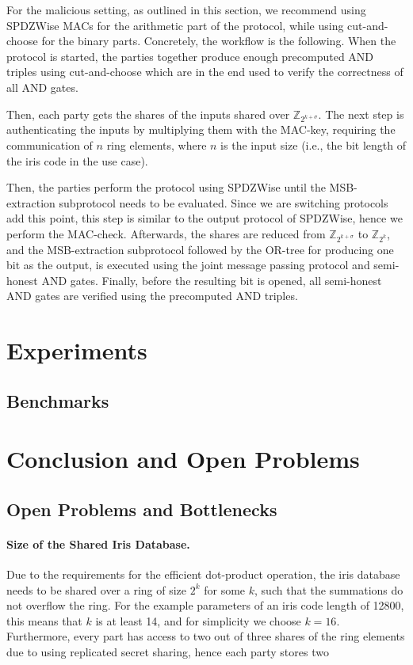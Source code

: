 \documentclass[a4paper,11pt,
]{article}
\newcommand{\Z}{\ensuremath{\mathbb{Z}}\xspace}
\begin{document}
For the malicious setting, as outlined in this section, we recommend using SPDZWise MACs  for the arithmetic part of the protocol, while using cut-and-choose  for the binary parts. Concretely, the workflow is the following. When the protocol is started, the parties together produce enough precomputed AND triples using cut-and-choose which are in the end used to verify the correctness of all AND gates.

Then, each party gets the shares of the inputs shared over $\Z_{2^{k + \sigma}}$. The next step is authenticating the inputs by multiplying them with the MAC-key, requiring the communication of $n$ ring elements, where $n$ is the input size (i.e., the bit length of the iris code in the use case).

Then, the parties perform the protocol using SPDZWise until the MSB-extraction subprotocol needs to be evaluated. Since we are switching protocols add this point, this step is similar to the output protocol of SPDZWise, hence we perform the MAC-check. Afterwards, the shares are reduced from $\Z_{2^{k + \sigma}}$ to $\Z_{2^k}$, and the MSB-extraction subprotocol followed by the OR-tree for producing one bit as the output, is executed using the joint message passing protocol and semi-honest AND gates. Finally, before the resulting bit is opened, all semi-honest AND gates are verified using the precomputed AND triples.


\section{Experiments}

\subsection{Benchmarks}

\section{Conclusion and Open Problems}

\subsection{Open Problems and Bottlenecks}

\paragraph{Size of the Shared Iris Database.}
Due to the requirements for the efficient dot-product operation, the iris database needs to be shared over a ring of size $2^k$ for some $k$, such that the summations do not overflow the ring.
For the example parameters of an iris code length of 12800, this means that $k$ is at least 14, and for simplicity we choose $k=16$.
Furthermore, every part has access to two out of three shares of the ring elements due to using replicated secret sharing, hence each party stores two
\end{document}
